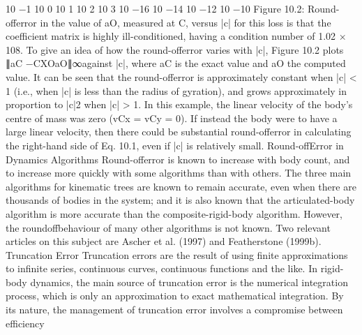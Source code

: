 10 −1 10 0 10 1 10 2 10 3 10 −16 10 −14 10 −12 10 −10 Figure 10.2: Round-offerror in the value of aO, measured at C, versus |c| for this loss is that the coefficient matrix is highly ill-conditioned, having a condition number of 1.02 × 108. To give an idea of how the round-offerror varies with |c|, Figure 10.2 plots ∥aC −CXOaO∥∞against |c|, where aC is the exact value and aO the computed value. It can be seen that the round-offerror is approximately constant when |c| < 1 (i.e., when |c| is less than the radius of gyration), and grows approximately in proportion to |c|2 when |c| > 1. In this example, the linear velocity of the body’s centre of mass was zero (vCx = vCy = 0). If instead the body were to have a large linear velocity, then there could be substantial round-offerror in calculating the right-hand side of Eq. 10.1, even if |c| is relatively small. Round-offError in Dynamics Algorithms Round-offerror is known to increase with body count, and to increase more quickly with some algorithms than with others. The three main algorithms for kinematic trees are known to remain accurate, even when there are thousands of bodies in the system; and it is also known that the articulated-body algorithm is more accurate than the composite-rigid-body algorithm. However, the roundoffbehaviour of many other algorithms is not known. Two relevant articles on this subject are Ascher et al. (1997) and Featherstone (1999b). Truncation Error Truncation errors are the result of using finite approximations to infinite series, continuous curves, continuous functions and the like. In rigid-body dynamics, the main source of truncation error is the numerical integration process, which is only an approximation to exact mathematical integration. By its nature, the management of truncation error involves a compromise between efficiency

